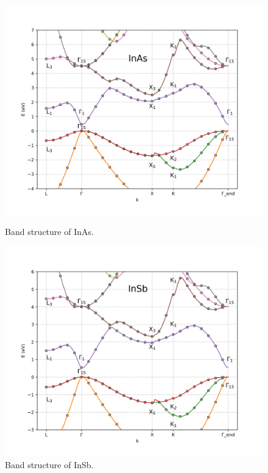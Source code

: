 \documentclass[twocolumn]{article}[h]
\begin{document}
\begin{figure}[htb]
    \centering
    \includegraphics[width=\linewidth]{InAs.png}
    \vspace{-1cm}
    \caption{Band structure of InAs.}
    \label{fig:InAs}

    \centering
    \includegraphics[width=\linewidth]{InSb.png}
    \vspace{-1cm}
    \caption{Band structure of InSb.}
    \label{fig:InSb}


\end{figure}
\end{document}
